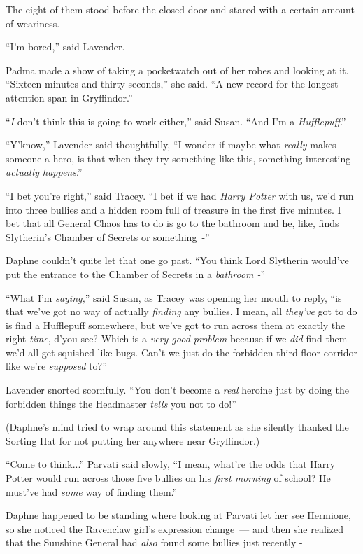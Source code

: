 The eight of them stood before the closed door and stared with a certain amount of weariness.

``I'm bored,'' said Lavender.

Padma made a show of taking a pocketwatch out of her robes and looking at it. ``Sixteen minutes and thirty seconds,'' she said. ``A new record for the longest attention span in Gryffindor.''

``\emph{I} don't think this is going to work either,'' said Susan. ``And I'm a \emph{Hufflepuff}.''

``Y'know,'' Lavender said thoughtfully, ``I wonder if maybe what \emph{really} makes someone a hero, is that when they try something like this, something interesting \emph{actually happens}.''

``I bet you're right,'' said Tracey. ``I bet if we had \emph{Harry Potter} with us, we'd run into three bullies and a hidden room full of treasure in the first five minutes. I bet that all General Chaos has to do is go to the bathroom and he, like, finds Slytherin's Chamber of Secrets or something~-''

Daphne couldn't quite let that one go past. ``You think Lord Slytherin would've put the entrance to the Chamber of Secrets in a \emph{bathroom -}''

``What I'm \emph{saying,}'' said Susan, as Tracey was opening her mouth to reply, ``is that we've got no way of actually \emph{finding} any bullies. I mean, all \emph{they've} got to do is find a Hufflepuff somewhere, but we've got to run across them at exactly the right \emph{time}, d'you see? Which is a \emph{very good problem} because if we \emph{did} find them we'd all get squished like bugs. Can't we just do the forbidden third-floor corridor like we're \emph{supposed} to?''

Lavender snorted scornfully. ``You don't become a \emph{real} heroine just by doing the forbidden things the Headmaster \emph{tells} you not to do!''

(Daphne's mind tried to wrap around this statement as she silently thanked the Sorting Hat for not putting her anywhere near Gryffindor.)

``Come to think...'' Parvati said slowly, ``I mean, what're the odds that Harry Potter would run across those five bullies on his \emph{first morning} of school? He must've had \emph{some} way of finding them.''

Daphne happened to be standing where looking at Parvati let her see Hermione, so she noticed the Ravenclaw girl's expression change~--- and then she realized that the Sunshine General had \emph{also} found some bullies just recently -

